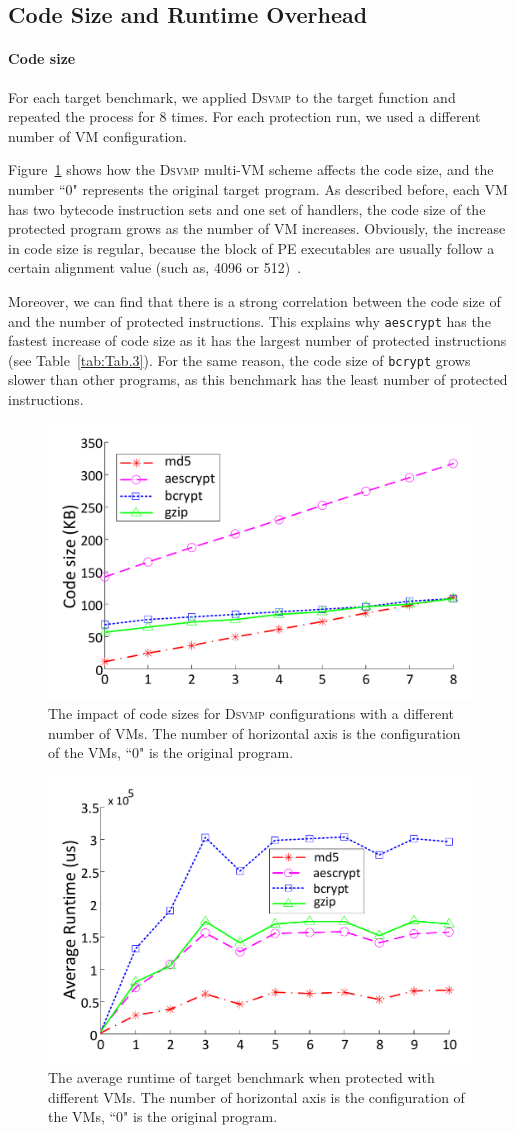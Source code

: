 \documentclass[times]{secauth}
\newcommand{\DSVMP}{\textsc{Dsvmp }}
\begin{document}
\subsection{Code Size and Runtime Overhead}
\paragraph*{Code size} For each target benchmark, we applied \DSVMP to the target function and repeated the process for 8 times.
For each protection run, we used a different number of VM configuration.

Figure~\ref{fig:Fig.size} shows how the \DSVMP multi-VM scheme affects the code size,
and the number ``0" represents the original target program.
As described before, each VM has two bytecode instruction sets and one set of handlers,
the code size of the protected program grows as the number of VM increases.
Obviously, the increase in code size is regular, because the block of PE executables
are usually follow a certain alignment value (such as, 4096 or 512)~\cite{pe}.

Moreover, we can find that there is a strong correlation between the code size of and the number of protected instructions.
This explains why \texttt{aescrypt} has the fastest increase of code size as it has
the largest number of protected instructions (see Table~\ref{tab:Tab.3}).
For the same reason, the code size of \texttt{bcrypt} grows slower than other programs,
as this benchmark has the least number of protected instructions.

\begin{figure}[!t]
\centering
\includegraphics[width=.45\textwidth]{figure/codesize.pdf}
\caption{The impact of code sizes for \DSVMP configurations with a different number of VMs. The number of horizontal axis is the configuration of the VMs, ``0" is the original program.}\label{fig:Fig.size}
\end{figure}

\begin{figure}[!t]
\centering
\includegraphics[width=.45\textwidth]{figure/runtime.pdf}
\caption{The average runtime of target benchmark when protected with different VMs. The number of horizontal axis is the configuration of the VMs, ``0" is the original program.}\label{fig:Fig.time}
\end{figure}
\end{document}
